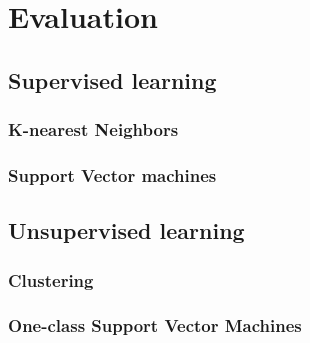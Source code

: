 
\chapter{Evaluation} %

\label{evaluation} %

\section{Supervised learning}

\subsection{K-nearest Neighbors}

\subsection{Support Vector machines}

\section{Unsupervised learning}

\subsection{Clustering}

\subsection{One-class Support Vector Machines}